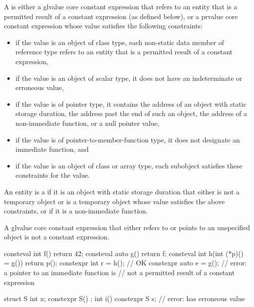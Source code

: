 \pnum
A  is either
a glvalue core constant expression that refers to
an entity that is a permitted result of a constant expression (as defined below), or
a prvalue core constant expression whose value
satisfies the following constraints:
\begin{itemize}
  \item
  if the value is an object of class type,
  each non-static data member of reference type refers to
  an entity that is a permitted result of a constant expression,

  \item
  if the value is an object of scalar type,
  it does not have an indeterminate or erroneous value,

  \item
  if the value is of pointer type, it contains
  the address of an object with static storage duration,
  the address past the end of such an object,
  the address of a non-immediate function,
  or a null pointer value,

  \item
  if the value is of pointer-to-member-function type,
  it does not designate an immediate function, and

  \item
  if the value is an object of class or array type,
  each subobject satisfies these constraints for the value.
\end{itemize}
An entity is a
if it is an
object with static storage duration that either is not a temporary object or is
a temporary object whose value satisfies the above constraints, or if
it is a non-immediate function.
\begin{note}
A glvalue core constant expression
that either refers to or points to an unspecified object
is not a constant expression.
\end{note}
\begin{example}
\begin{codeblock}
consteval int f() { return 42; }
consteval auto g() { return f; }
consteval int h(int (*p)() = g()) { return p(); }
constexpr int r = h();                          // OK
constexpr auto e = g();                         // error: a pointer to an immediate function is
                                                // not a permitted result of a constant expression

struct S {
  int x;
  constexpr S() {}
};
int i() {
  constexpr S s;                                // error:  has erroneous value
}
\end{codeblock}
\end{example}

